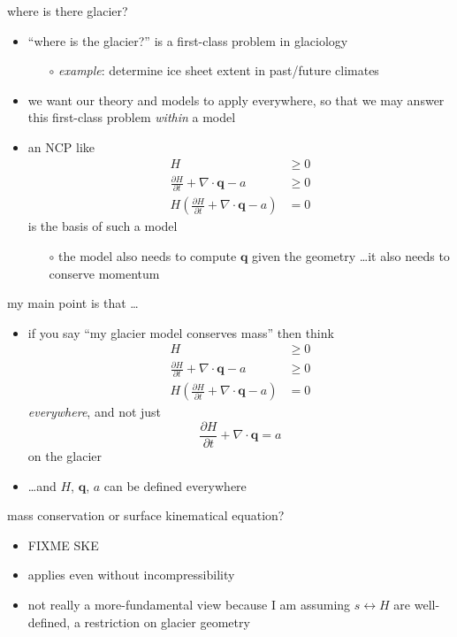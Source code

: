 \documentclass[10pt,hyperref,dvipsnames]{beamer}
\newcommand{\bq}{\mathbf{q}}
\newcommand{\Div}{\nabla\cdot}
\begin{document}
\begin{frame}{where is there glacier?}
\begin{itemize}
\item ``where is the glacier?'' is a first-class problem in glaciology
    \begin{itemize}
    \item[$\circ$] \emph{example}: determine ice sheet extent in past/future climates
    \end{itemize}
\item we want our theory and models to apply everywhere, so that we may answer this first-class problem \emph{within} a model
\item an NCP like
\begin{align*}
H &\ge 0 \\
\frac{\partial H}{\partial t} + \Div \bq - a &\ge 0 \\
H \left(\frac{\partial H}{\partial t} + \Div \bq - a\right) &= 0
\end{align*}
is the basis of such a model
    \begin{itemize}
    \item[$\circ$] the model also needs to compute $\bq$ given the geometry \dots it also needs to conserve momentum
    \end{itemize}
\end{itemize}
\end{frame}


\begin{frame}{my main point is that \dots}
\begin{itemize}
\item if you say ``my glacier model conserves mass'' then think
\begin{align*}
H &\ge 0 \\
\frac{\partial H}{\partial t} + \Div \bq - a &\ge 0 \\
H \left(\frac{\partial H}{\partial t} + \Div \bq - a\right) &= 0
\end{align*}
\emph{everywhere}, and not just
    $$\frac{\partial H}{\partial t} + \Div \bq = a$$
on the glacier

\medskip
\item<2> \dots and $H$, $\bq$, $a$ can be defined everywhere
\end{itemize}
\end{frame}


\begin{frame}{mass conservation or surface kinematical equation?}
\begin{itemize}
\item FIXME SKE 
\item applies even without incompressibility
\item not really a more-fundamental view because I am assuming $s \leftrightarrow H$ are well-defined, a restriction on glacier geometry
\end{itemize}
\end{frame}
\end{document}
